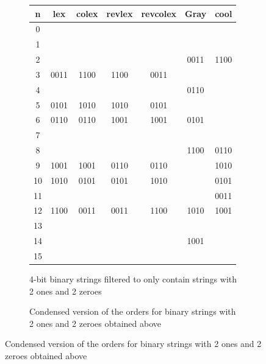\begin{figure}[]
     \begin{subfigure}[]{\textwidth}
         \begin{center}
         \caption{4-bit binary strings filtered to only contain strings with 2 ones and 2 zeroes}
             \begin{tabular}{ |c|c|c|c|c||c||c| } 
                 \hline
                 n &  lex  & colex & revlex & revcolex & Gray & cool\\
                 \hline
                 0 &      &      &      &      &       &      \\
                 1 &      &      &      &      &       &      \\
                 2 &      &      &      &      & 0011  & 1100 \\
                 3 & 0011 & 1100 & 1100 & 0011 &       &      \\
                 4 &      &      &      &      & 0110  &      \\
                 5 & 0101 & 1010 & 1010 & 0101 &       &      \\
                 6 & 0110 & 0110 & 1001 & 1001 & 0101  &      \\
                 7 &      &      &      &      &       &      \\
                 8 &      &      &      &      & 1100  & 0110 \\
                 9 & 1001 & 1001 & 0110 & 0110 &       & 1010 \\
                 10 & 1010 & 0101 & 0101 & 1010 &      & 0101 \\
                 11 &      &      &      &      &      & 0011 \\
                 12 & 1100 & 0011 & 0011 & 1100 & 1010 & 1001 \\
                 13 &      &      &      &      &      &      \\
                 14 &      &      &      &      & 1001 &      \\
                 15 &      &      &      &      &      &      \\
                 \hline
             \end{tabular}
         \end{center}
         \label{fig:bin4to2c2}
     \end{subfigure}
     \begin{subfigure}[]{\textwidth}
         \caption{Condensed version of the orders for binary strings with 2 ones and 2 zeroes obtained above}

\end{subfigure}
\end{figure}
